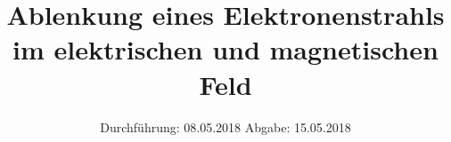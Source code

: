 

\subject{Versuch 501/502}
\title{Ablenkung eines Elektronenstrahls im elektrischen und magnetischen Feld}
\date{%
  Durchführung: 08.05.2018
  \hspace{3em}
  Abgabe: 15.05.2018
}



\maketitle
\thispagestyle{empty}
\tableofcontents
\newpage






\printbibliography{}


